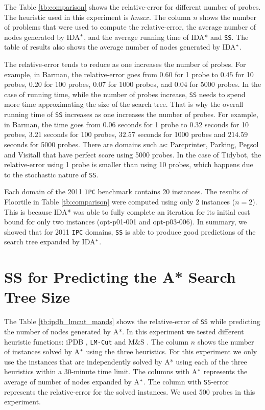 The Table \ref{tb:comparison} shows the relative-error for different number of probes. The heuristic used in this experiment is $hmax$. The column $n$ shows the number of problems that were used to compute the relative-error, the average number of nodes generated by IDA$\sp{*}$, and the average running time of IDA* and \texttt{SS}. The table of results also shows the average number of nodes generated by IDA$\sp{*}$. %

The relative-error tends to reduce as one increases the number of probes. For example, in Barman, the relative-error goes from $0.60$ for 1 probe to $0.45$ for 10 probes, $0.20$ for 100 probes, $0.07$ for 1000 probes, and $0.04$ for 5000 probes. In the case of running time, while the number of probes increase, \texttt{SS} needs to spend more time approximating the size of the search tree. That is why the overall running time of \texttt{SS} increases as one increases the number of probes. For example, in Barman, the time goes from $0.06$ seconds for 1 probe to $0.32$ seconds for 10 probes, $3.21$ seconds for 100 probes, $32.57$ seconds for 1000 probes and $214.59$ seconds for 5000 probes. There are domains such as: Parcprinter, Parking, Pegsol and Visitall that have perfect score using 5000 probes. In the case of Tidybot, the relative-error using 1 probe is smaller than using 10 probes, which happens due to the stochastic nature of \texttt{SS}.

Each domain of the 2011 \texttt{IPC} benchmark contains 20 instances. The results of Floortile in Table \ref{tb:comparison} were computed using only 2 instances ($n=2$). This is because IDA* was able to fully complete an iteration for its initial cost bound for only two instances (opt-p01-001 and opt-p03-006). In summary, we showed that for 2011 \texttt{IPC} domains, \texttt{SS} is able to produce good predictions of the search tree expanded by IDA$\sp{*}$. %

\section{SS for Predicting the A* Search Tree Size}

\noindent
The Table \ref{tb:ipdb_lmcut_mands} shows the relative-error of \texttt{SS} while predicting the number of nodes generated by A*. In this experiment we tested different heuristic functions: iPDB \cite{haslum2007domain}, \texttt{LM-Cut} \cite{PommereningH13} and M$\&$S \cite{nissim2011computing}. The column $n$ shows the number of instances solved by A$\sp{*}$ using the three heuristics. For this experiment we only use the instances that are independently solved by A* using each of the three heuristics within a 30-minute time limit. The columns with A$\sp{*}$ represents the average of number of nodes expanded by A$\sp{*}$. The column with \texttt{SS}-error represents the relative-error for the solved instances. We used 500 probes in this experiment. 


